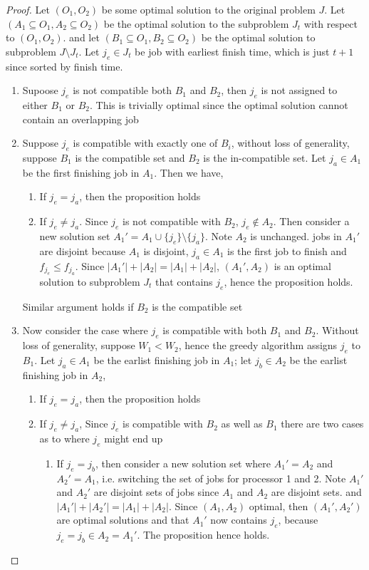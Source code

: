 \documentclass[11pt]{article}
\begin{document}
\begin{enumerate}
  \begin{proof}
    Let $(O_1, O_2)$ be some optimal solution to the original problem $J$. Let $(A_1 \subseteq O_1, A_2\subseteq O_2)$ be the optimal solution to the subproblem $J_t$ with respect to $(O_1, O_2)$. and let $(B_1 \subseteq O_1, B_2\subseteq O_2)$ be the optimal solution to subproblem $J\setminus J_t$. Let $j_e\in J_t$ be job with earliest finish time, which is just $t+1$ since sorted by finish time.
    \begin{enumerate}
      \item Supoose $j_e$ is not compatible both $B_1$ and $B_2$, then $j_e$ is not assigned to either $B_1$ or $B_2$. This is trivially optimal since the optimal solution cannot contain an overlapping job
      \item Suppose $j_e$ is compatible with exactly one of $B_i$, without loss of generality, suppose $B_1$ is the compatible set and $B_2$ is the in-compatible set. Let $j_a \in A_1$ be the first finishing job in $A_1$. Then we have,
      \begin{enumerate}
        \item If $j_e = j_a$, then the proposition holds
        \item If $j_e \neq j_a$. Since $j_e$ is not compatible with $B_2$, $j_e\not\in A_2$. Then consider a new solution set $A_1' = A_1 \cup \{ j_e \} \setminus \{ j_a\}$. Note $A_2$ is unchanged. jobs in $A_1'$ are disjoint because $A_1$ is disjoint, $j_a\in A_1$ is the first job to finish and $f_{j_e} \leq f_{j_a}$. Since $|A_1'| + |A_2| = |A_1| + |A_2|$, $(A_1', A_2)$ is an optimal solution to subproblem $J_t$ that contains $j_e$, hence the proposition holds.
      \end{enumerate}
      Similar argument holds if $B_2$ is the compatible set
      \item Now consider the case where $j_e$ is compatible with both $B_1$ and $B_2$. Without loss of generality, suppose $W_1 < W_2$, hence the greedy algorithm assigns $j_e$ to $B_1$. Let $j_a\in A_1$ be the earlist finishing job in $A_1$; let $j_b\in A_2$ be the earlist finishing job in $A_2$,
      \begin{enumerate}
        \item If $j_e = j_a$, then the proposition holds
        \item If $j_e \neq j_a$, Since $j_e$ is compatible with $B_2$ as well as $B_1$ there are two cases as to where $j_e$ might end up
        \begin{enumerate}
          \item If $j_e = j_b$, then consider a new solution set where $A_1' = A_2$ and $A_2' = A_1$, i.e. switching the set of jobs for processor 1 and 2. Note $A_1'$ and $A_2'$ are disjoint sets of jobs since $A_1$ and $A_2$ are disjoint sets. and $|A_1'| + |A_2'| = |A_1| + |A_2|$. Since $(A_1, A_2)$ optimal, then $(A_1', A_2')$ are optimal solutions and that $A_1'$ now contains $j_e$, because $j_e = j_b \in A_2 = A_1'$. The proposition hence holds.

\end{enumerate}
\end{enumerate}
\end{enumerate}
\end{proof}
\end{enumerate}
\end{document}
